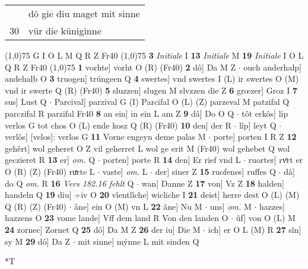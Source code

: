 \documentclass[8pt,a4paper,notitlepage]{article}
\begin{document}
\begin{table}[ht]
\begin{minipage}[t]{0.5\linewidth}
\begin{tabular}{rl}
 & dô gie diu maget mit sinne\\ 
30 & vür die küniginne\\ 
\end{tabular}
\scriptsize
\line(1,0){75} \newline
G I O L M Q R Z Fr40 \newline
\line(1,0){75} \newline
\textbf{3} \textit{Initiale} I  \textbf{13} \textit{Initiale} M  \textbf{19} \textit{Initiale} I O L Q R Z Fr40  \newline
\line(1,0){75} \newline
\textbf{1} vorhte] vorht O (R) (Fr40) \textbf{2} dô] Da M Z  $\cdot$ ouch anderhalp] andehalb O \textbf{3} truogen] trúngeen Q \textbf{4} swertes] vnd swertes I (L) ir swertes O (M) vnd ir swerte Q (R) (Fr40) \textbf{5} sluzzen] slugen M slvzzen die Z \textbf{6} grœzer] Groz I \textbf{7} sus] Lust Q  $\cdot$ Parcival] parzival G (I) Parcifal O (L) (Z) parzeval M patzifal Q parczifal R parzifal Fr40 \textbf{8} an ein] in ein L am Z \textbf{9} dâ] Do O Q  $\cdot$ tôt erkôs] lip verlos G tot chos O (L) ende kosz Q (R) (Fr40) \textbf{10} den] der R  $\cdot$ lîp] leyt Q  $\cdot$ verlôs] [velos]: verlos G \textbf{11} Vorne engeyn deme palas M  $\cdot$ porte] porten I R Z \textbf{12} gehêrt] wol geheret O Z vil geherret L wol ge erit M (Fr40) wol gehebet Q wol geczieret R \textbf{13} er] \textit{om.} Q  $\cdot$ porten] porte R \textbf{14} den] Er rief vnd L  $\cdot$ ruorter] rvͦrt er O (R) (Z) (Fr40) ruͯrte L  $\cdot$ vaste] \textit{om.} L  $\cdot$ der] siner Z \textbf{15} ruofenes] ruffes Q  $\cdot$ dâ] do Q \textit{om.} R \textbf{16} \textit{Vers 182.16 fehlt} Q   $\cdot$ wan] Danne Z \textbf{17} von] Vz Z \textbf{18} halden] handeln Q \textbf{19} diu] ÷iv O \textbf{20} vîentlîche] wicliche I \textbf{21} deist] herre dest O (L) (M) Q (R) (Z) (Fr40)  $\cdot$ âne] ein O (M) vn L \textbf{22} âne] Nu M  $\cdot$ uns] \textit{om.} M  $\cdot$ hazzes] hazzens O \textbf{23} vome lande] Vff dem land R Von den landen O  $\cdot$ ûf] von O (L) M \textbf{24} zornec] Zornet Q \textbf{25} dô] Da M Z \textbf{26} der iu] Die M  $\cdot$ ich] er O L (M) R \textbf{27} sîn] sy M \textbf{29} dô] Da Z  $\cdot$ mit sinne] mýnne L mit sinden Q \newline
\end{minipage}
\hspace{0.5cm}
\begin{minipage}[t]{0.5\linewidth}
\small
\begin{center}*T
\end{center}

\end{minipage}
\end{table}
\end{document}
